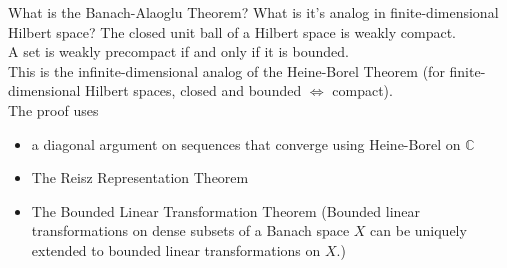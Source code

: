 \documentclass[avery5388,grid,frame]{flashcards}
\def\Cx{\mathbb{C}}
\begin{document}
\begin{flashcard}
    {What is the Banach-Alaoglu Theorem?  What is it's analog in finite-dimensional Hilbert space?}
    The closed unit ball of a Hilbert space is weakly compact. \\

    A set is weakly precompact if and only if it is bounded. \\

    This is the infinite-dimensional analog of the Heine-Borel Theorem (for finite-dimensional Hilbert spaces, closed and bounded $\iff$ compact). \\

    The proof uses
    \begin{itemize}
        \item a diagonal argument on sequences that converge using Heine-Borel on $\Cx$
        \item The Reisz Representation Theorem
        \item The Bounded Linear Transformation Theorem (Bounded linear transformations on dense subsets of a Banach space $X$ can be uniquely extended to bounded linear transformations on $X$.)
    \end{itemize}
\end{flashcard}
\end{document}
